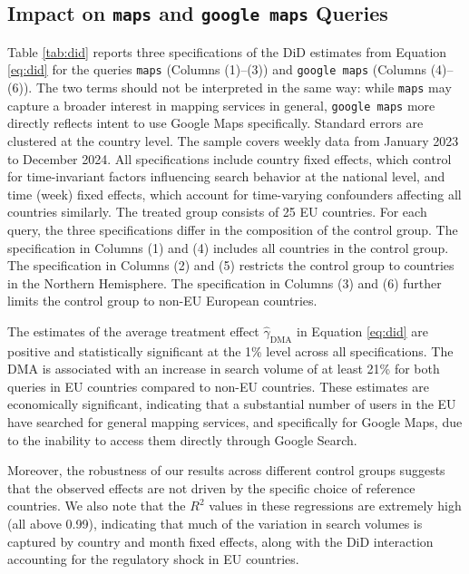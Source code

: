 \documentclass[11pt]{article}
\begin{document}
	\subsection{Impact on \texttt{maps} and \texttt{google maps} Queries} \label{subsec: volumes}
	
	Table \ref{tab:did} reports three specifications of the DiD estimates from Equation \ref{eq:did} for the queries \texttt{maps} (Columns (1)–(3)) and \texttt{google maps} (Columns (4)–(6)). The two terms should not be interpreted in the same way: while \texttt{maps} may capture a broader interest in mapping services in general, \texttt{google maps} more directly reflects intent to use Google Maps specifically. Standard errors are clustered at the country level. The sample covers weekly data from January 2023 to December 2024. All specifications include country fixed effects, which control for time-invariant factors influencing search behavior at the national level, and time (week) fixed effects, which account for time-varying confounders affecting all countries similarly. The treated group consists of 25 EU countries. For each query, the three specifications differ in the composition of the control group. The specification in Columns (1) and (4) includes all countries in the control group. The specification in Columns (2) and (5) restricts the control group to countries in the Northern Hemisphere. The specification in Columns (3) and (6) further limits the control group to non-EU European countries.
	
	The estimates of the average treatment effect  $\hat{\gamma}_{\mathrm{DMA}}$ in Equation \ref{eq:did} are positive and statistically significant at the 1\% level across all specifications. The DMA is associated with an increase in search volume of at least 21\% for both queries in EU countries compared to non-EU countries. These estimates are economically significant, indicating that a substantial number of users in the EU have searched for general mapping services, and specifically for Google Maps, due to the inability to access them directly through Google Search. 
	
	Moreover, the robustness of our results across different control groups suggests that the observed effects are not driven by the specific choice of reference countries. We also note that the \( R^2 \) values in these regressions are extremely high (all above 0.99), indicating that much of the variation in search volumes is captured by country and month fixed effects, along with the DiD interaction accounting for the regulatory shock in EU countries.
	
\end{document}
